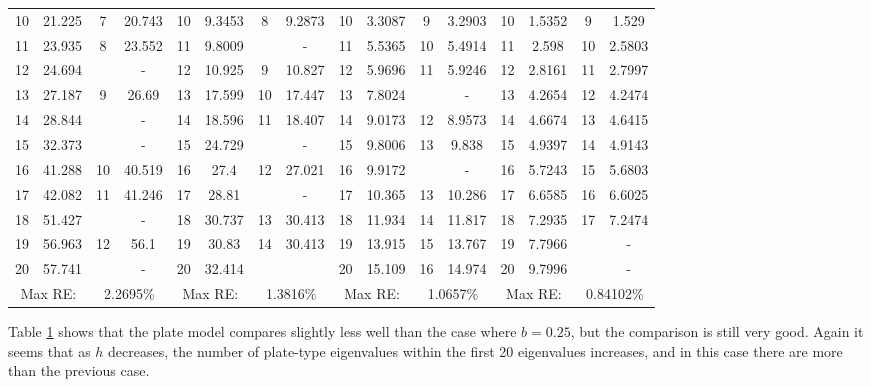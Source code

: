 \documentclass[../../main.tex]{subfiles}
\begin{document}
\begin{table}[htbp]
{{\begin{tabular}{|cccc||cccc||cccc||cccc|}
			10    & 21.225 & 7     & {20.743} & 10    & 9.3453 & 8     & 9.2873 & 10    & 3.3087 & 9     & 3.2903 & 10    & 1.5352 & 9     & {1.529} \\
			11    & 23.935 & 8     & {23.552} & 11    & 9.8009 &       & {-} & 11    & 5.5365 & 10    & 5.4914 & 11    & 2.598 & 10    & {2.5803} \\
			12    & 24.694 &       & -     & 12    & 10.925 & 9     & 10.827 & 12    & 5.9696 & 11    & 5.9246 & 12    & 2.8161 & 11    & {2.7997} \\
			13    & 27.187 & 9     & {26.69} & 13    & 17.599 & 10    & 17.447 & 13    & 7.8024 &       & {-} & 13    & 4.2654 & 12    & {4.2474} \\
			14    & 28.844 &       & -     & 14    & 18.596 & 11    & 18.407 & 14    & 9.0173 & 12    & 8.9573 & 14    & 4.6674 & 13    & {4.6415} \\
			15    & 32.373 &       & -     & 15    & 24.729 &       & {-} & 15    & 9.8006 & 13    & 9.838 & 15    & 4.9397 & 14    & {4.9143} \\
			16    & 41.288 & 10    & {40.519} & 16    & 27.4  & 12    & 27.021 & 16    & 9.9172 &       & {-} & 16    & 5.7243 & 15    & {5.6803} \\
			17    & 42.082 & 11    & {41.246} & 17    & 28.81 &       & {-} & 17    & 10.365 & 13    & 10.286 & 17    & 6.6585 & 16    & {6.6025} \\
			18    & 51.427 &       & -     & 18    & 30.737 & 13    & 30.413 & 18    & 11.934 & 14    & 11.817 & 18    & 7.2935 & 17    & {7.2474} \\
			19    & 56.963 & 12    & {56.1} & 19    & 30.83 & 14    & 30.413 & 19    & 13.915 & 15    & 13.767 & 19    & 7.7966 &       & - \\
			20    & 57.741 &       & -     & 20    & 32.414 &       &       & 20    & 15.109 & 16    & 14.974 & 20    & 9.7996 &       & - \\
			\hline
			\multicolumn{2}{|c}{Max RE:} & \multicolumn{2}{c||}{2.2695\%} & \multicolumn{2}{c}{Max RE:} & \multicolumn{2}{c||}{1.3816\%} & \multicolumn{2}{c}{Max RE:} & \multicolumn{2}{c||}{1.0657\%} & \multicolumn{2}{c}{Max RE:} & \multicolumn{2}{c|}{0.84102\%} \\
			\hline
		\end{tabular}%
		\label{tab:Table_plate_2}%
	}}
\end{table}%
\FloatBarrier

Table \ref{tab:Table_plate_2} shows that the plate model compares slightly less well than the case where $b=0.25$, but the comparison is still very good. Again it seems that as $h$ decreases, the number of plate-type eigenvalues within the first 20 eigenvalues increases, and in this case there are more than the previous case.
\end{document}
